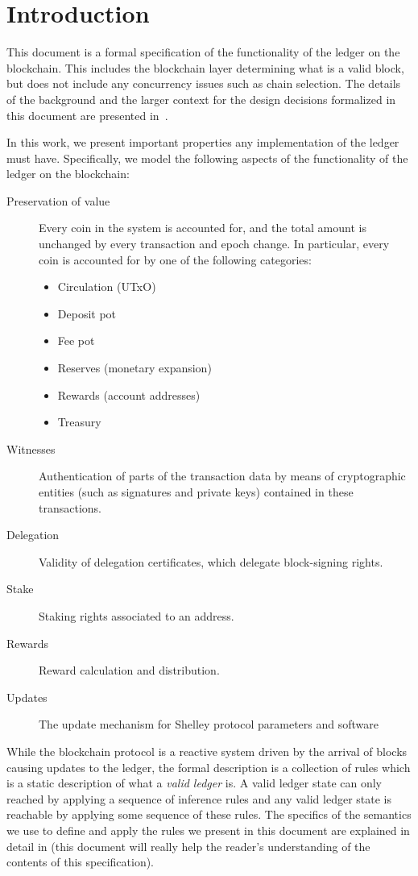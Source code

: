 \section{Introduction}
\label{sec:introduction-shelley}

This document is a formal specification of the functionality of the ledger on the blockchain.
This includes the blockchain layer determining what is a valid block,
but does not include any concurrency issues such as chain selection.
The details of the background and the larger context
for the design decisions formalized in this document are presented
in~\cite{delegation_design}.

In this work,
we present important properties any implementation of the ledger must have.
Specifically, we model the following aspects
of the functionality of the ledger on the blockchain:

\begin{description}
\item[Preservation of value] Every coin in the system is accounted for,
  and the total amount is unchanged by every transaction and epoch change.
  In particular, every coin is accounted for by one of the following categories:
  \begin{itemize}
    \item Circulation (UTxO)
    \item Deposit pot
    \item Fee pot
    \item Reserves (monetary expansion)
    \item Rewards (account addresses)
    \item Treasury
  \end{itemize}
\item[Witnesses] Authentication of parts of the transaction data by means of
  cryptographic entities (such as signatures and private keys) contained in
  these transactions.
\item[Delegation] Validity of delegation certificates, which delegate
  block-signing rights.
\item[Stake] Staking rights associated to an address.
\item[Rewards] Reward calculation and distribution.
\item[Updates] The update mechanism for Shelley protocol parameters and software
\end{description}

While the blockchain protocol is a reactive system driven by the arrival
of blocks causing updates to the ledger, the formal description is a collection
of rules which is a
static description of what a \textit{valid ledger} is. A valid ledger state can only
reached by applying a sequence of inference rules and any valid ledger state
is reachable by applying some sequence of these rules.
The specifics of the semantics we use to define and apply
the rules we present in this document are explained in detail in
\cite{small_step_semantics} (this document will really help the reader's
understanding of the contents of this specification).

